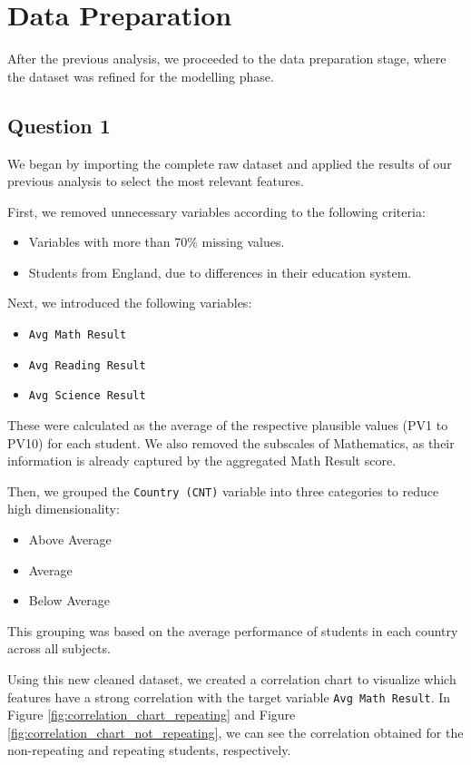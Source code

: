 \section{Data Preparation}\label{sec:data_preparation}

After the previous analysis, we proceeded to the data preparation stage, where the dataset was refined for the modelling phase.

\subsection{Question 1}

We began by importing the complete raw dataset and applied the results of our previous analysis to select the most relevant features.

First, we removed unnecessary variables according to the following criteria:
\begin{itemize}
    \itemsep0em
    \item Variables with more than 70\% missing values.
    \item Students from England, due to differences in their education system.
\end{itemize}

\noindent
Next, we introduced the following variables:
\begin{itemize}
    \itemsep0em
    \item \texttt{Avg Math Result}
    \item \texttt{Avg Reading Result}
    \item \texttt{Avg Science Result}
\end{itemize}

\noindent
These were calculated as the average of the respective plausible values (PV1 to PV10) for each student.
We also removed the subscales of Mathematics, as their information is already captured by the aggregated Math Result score.

Then, we grouped the \texttt{Country (CNT)} variable into three categories to reduce high dimensionality:
\begin{itemize}
    \itemsep0em
    \item Above Average
    \item Average
    \item Below Average
\end{itemize}
This grouping was based on the average performance of students in each country across all subjects.

Using this new cleaned dataset, we created a correlation chart to visualize which features have a strong correlation with the target variable \texttt{Avg Math Result}.
In Figure \ref{fig:correlation_chart_repeating} and Figure \ref{fig:correlation_chart_not_repeating}, we can see the correlation obtained for the non-repeating and repeating students, respectively.

